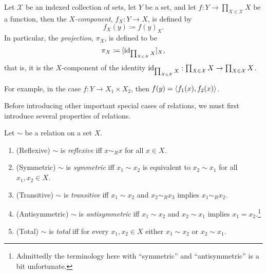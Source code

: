 \begin{dfn}
Let $\mathcal{X}$ be an indexed collection of sets, let $Y$ be a set, and let $f:Y\rightarrow \prod _{X\in \mathcal{X}}X$ be a function, then the \emph{$X$-component}, $f_X:Y\rightarrow X$, is defined by
\begin{equation}
f_X(y)\coloneqq f(y)_X.
\end{equation}
In particular, the \emph{projection}, $\pi _X$, is defined to be
\begin{equation}
\pi _X\coloneqq [\operatorname{id} _{\prod _{X\in \mathcal{X}}X}]_X,
\end{equation}
that is, it is the $X$-component of the identity $\operatorname{id} _{\prod _{X\in \mathcal{X}}X}:\prod _{X\in \mathcal{X}}X\rightarrow \prod _{X\in \mathcal{X}}X$.
\begin{rmk}
For example, in the case $f:Y\rightarrow X_1\times X_2$, then $f(y)=\langle f_1(x),f_2(x)\rangle$.
\end{rmk}
\end{dfn}

\horizontalrule

Before introducing other important special cases of relations, we must first introduce several properties of relations.
\begin{dfn}
Let $\sim$ be a relation on a set $X$.
\begin{enumerate}
\item (Reflexive) $\sim$ is \emph{reflexive} iff $x\sim _Rx$ for all $x\in X$.
\item (Symmetric) $\sim$ is \emph{symmetric} iff $x_1\sim x_2$ is equivalent to $x_2\sim x_1$ for all $x_1,x_2\in X$.
\item (Transitive) $\sim$ is \emph{transitive} iff $x_1\sim x_2$ and $x_2\sim _Rx_3$ implies $x_1\sim _Rx_2$.
\item (Antisymmetric) $\sim$ is \emph{antisymmetric} iff $x_1\sim x_2$ and $x_2\sim x_1$ implies $x_1=x_2$.\footnote{Admittedly the terminology here with ``symmetric'' and ``antisymmetric'' is a bit unfortunate.}
\item (Total) $\sim$ is \emph{total} iff for every $x_1,x_2\in X$ either $x_1\sim x_2$ or $x_2\sim x_1$.
\end{enumerate}
\end{dfn}

